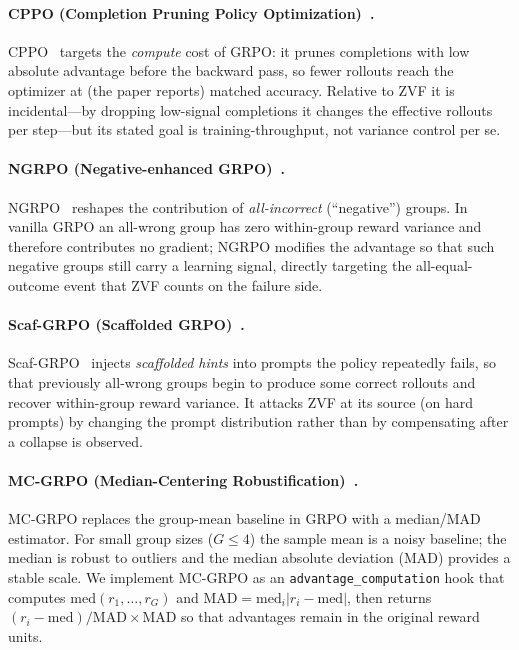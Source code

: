 \paragraph{CPPO (Completion Pruning Policy Optimization)~\cite{lin2025cppo}.}
CPPO~\citep{lin2025cppo} targets the \emph{compute} cost of GRPO: it prunes
completions with low absolute advantage before the backward pass, so fewer
rollouts reach the optimizer at (the paper reports) matched accuracy. Relative
to ZVF it is incidental---by dropping low-signal completions it changes the
effective rollouts per step---but its stated goal is training-throughput, not
variance control per se.

\paragraph{NGRPO (Negative-enhanced GRPO)~\cite{nan2025ngrpo}.}
NGRPO~\citep{nan2025ngrpo} reshapes the contribution of \emph{all-incorrect}
(``negative'') groups. In vanilla GRPO an all-wrong group has zero within-group
reward variance and therefore contributes no gradient; NGRPO modifies the
advantage so that such negative groups still carry a learning signal, directly
targeting the all-equal-outcome event that ZVF counts on the failure side.

\paragraph{Scaf-GRPO (Scaffolded GRPO)~\cite{zhang2025scaffgrpo}.}
Scaf-GRPO~\citep{zhang2025scaffgrpo} injects \emph{scaffolded hints} into prompts the
policy repeatedly fails, so that previously all-wrong groups begin to produce
some correct rollouts and recover within-group reward variance. It attacks ZVF
at its source (on hard prompts) by changing the prompt distribution rather than
by compensating after a collapse is observed.

\paragraph{MC-GRPO (Median-Centering Robustification)~\cite{mcgrpo2025}.}
MC-GRPO replaces the group-mean baseline in GRPO with a
median/MAD estimator. For small group sizes ($G \le 4$) the sample
mean is a noisy baseline; the median is robust to outliers and the
median absolute deviation (MAD) provides a stable scale. We
implement MC-GRPO as an \texttt{advantage\_computation} hook that
computes $\mathrm{med}(r_1,\dots,r_G)$ and
$\mathrm{MAD} = \mathrm{med}_i|r_i - \mathrm{med}|$, then returns
$(r_i - \mathrm{med}) / \mathrm{MAD} \times \mathrm{MAD}$ so that
advantages remain in the original reward units.

